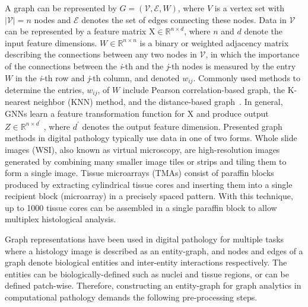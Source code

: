 A graph can be represented by $G=(\mathcal{V},\mathcal{E},W)$, where $V$ is a vertex set with $|\mathcal{V}|=n$ nodes and $\mathcal{E}$ denotes the set of edges connecting these nodes.
Data in $\mathcal{V}$ can be represented by a feature matrix $\mathrm{X} \in \mathbb{R}^{n \times d}$, where $n$ and $d$ denote the input feature dimensions.
$W \in \mathbb{R}^{n \times n}$ is a binary or weighted adjacency matrix describing the connections between any two nodes in $\mathcal{V}$, in which the importance of the connections between the \textit{i}-th and the \textit{j}-th nodes is measured by the entry  $W$ in the \textit{i}-th row and \textit{j}-th column, and denoted $w_{ij}$.
Commonly used methods to determine the entries, $w_{ij}$, of $W$ include Pearson correlation-based graph, the K-nearest neighbor (KNN) method, and the distance-based graph~. 
In general, GNNs learn a feature transformation function for $\mathrm{X}$ and produce output $Z \in \mathbb{R}^{n \times d^{'}}$ , where $d^{'}$ denotes the output feature dimension.
Presented graph methods in digital pathology typically use data in one of two forms. Whole slide images (WSI), also known as virtual microscopy, are high-resolution images generated by combining many smaller image tiles or strips and tiling them to form a single image. Tissue microarrays (TMAs) consist of paraffin blocks produced by extracting cylindrical tissue cores and inserting them into a single recipient block (microarray) in a precisely spaced pattern. With this technique, up to 1000 tissue cores can be assembled in a single paraffin block to allow multiplex histological analysis.

Graph representations have been used in digital pathology for multiple tasks where a histology image is described as an entity-graph, and nodes and edges of a graph denote biological entities and inter-entity interactions respectively. 
The entities can be biologically-defined such as nuclei and tissue regions, or can be defined patch-wise. 
Therefore, constructing an entity-graph for graph analytics in computational pathology demands the following pre-processing steps.

